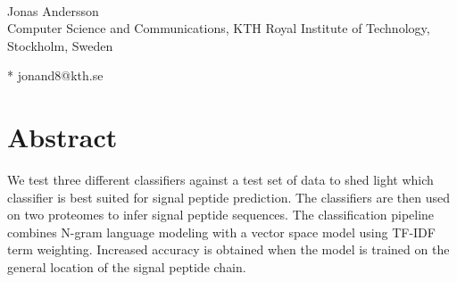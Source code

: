 \documentclass[10pt,letterpaper]{article}
\date{}
\begin{document}
	\vspace*{0.2in}
	
	\begin{flushleft}
		{\Large
			\textbf{} %
		}
		\newline
		\\
		Jonas Andersson
		\\
		\bigskip
		Computer Science and Communications, KTH Royal Institute of Technology, Stockholm, Sweden
		\bigskip
		
		
		
		
		
		
		* jonand8@kth.se
		
	\end{flushleft}
	\section*{Abstract}
	We test three different classifiers against a test set of data to shed light which classifier is best suited for signal peptide prediction. The classifiers are then used on two proteomes to infer signal peptide sequences. The classification pipeline combines N-gram language modeling with a vector space model using TF-IDF term weighting. Increased accuracy is obtained when the model is trained on the general location of the signal peptide chain. 
	
\end{document}
